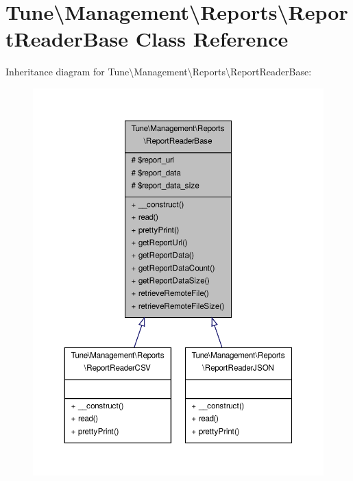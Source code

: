 \hypertarget{classTune_1_1Management_1_1Reports_1_1ReportReaderBase}{\section{Tune\textbackslash{}Management\textbackslash{}Reports\textbackslash{}Report\-Reader\-Base Class Reference}
\label{classTune_1_1Management_1_1Reports_1_1ReportReaderBase}
}


Inheritance diagram for Tune\textbackslash{}Management\textbackslash{}Reports\textbackslash{}Report\-Reader\-Base\-:
\nopagebreak
\begin{figure}[H]
\begin{center}
\leavevmode
\includegraphics[width=350pt]{classTune_1_1Management_1_1Reports_1_1ReportReaderBase__inherit__graph}
\end{center}
\end{figure}


